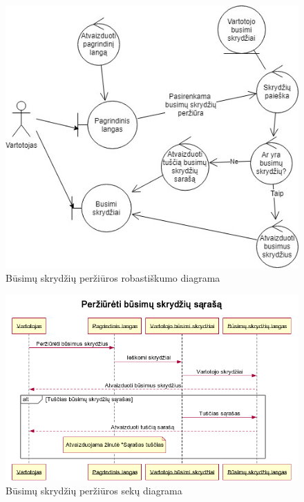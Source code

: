 \documentclass{VUMIFPSkursinis}
\begin{document}
\begin{enumerate}[label=\textbf{U\arabic*}.]
                    \begin{figure}[H]
                        \centering
                        \includegraphics[scale=0.8]{img/ROBflights}
                        \caption{Būsimų skrydžių peržiūros robastiškumo diagrama}
                        \label{home_page_one_way}
                    \end{figure}

                    \begin{figure}[H]
                        \centering
                        \includegraphics[scale=0.8]{img/seqUpList}
                        \caption{Būsimų skrydžių peržiūros sekų diagrama}
                        \label{home_page_one_way}
                    \end{figure}


\end{enumerate}
\end{document}
